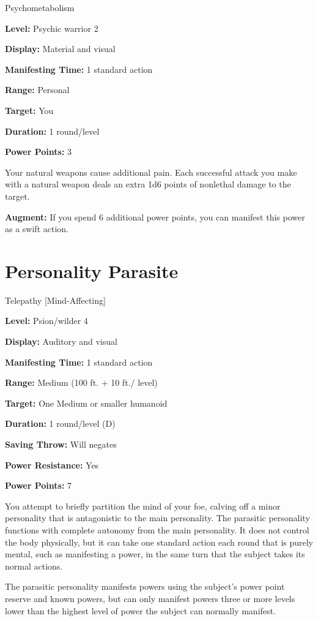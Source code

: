 \documentclass{article}
\begin{document}
Psychometabolism

\textbf{Level:} Psychic warrior 2

\textbf{Display:} Material and visual

\textbf{Manifesting Time:} 1 standard action

\textbf{Range:} Personal

\textbf{Target:} You

\textbf{Duration:} 1 round/level

\textbf{Power Points:} 3

Your natural weapons cause additional pain. Each successful attack you make with 
a natural weapon deals an extra 1d6 points of nonlethal damage to the target.

\textbf{Augment:} If you spend 6 additional power points, you can manifest this 
power as a swift action.

\vspace{12pt}
\section*{Personality Parasite}

Telepathy [Mind-Affecting]

\textbf{Level:} Psion/wilder 4

\textbf{Display:} Auditory and visual

\textbf{Manifesting Time:} 1 standard action

\textbf{Range:} Medium (100 ft. + 10 ft./ level)

\textbf{Target:} One Medium or smaller humanoid

\textbf{Duration:} 1 round/level (D)

\textbf{Saving Throw:} Will negates

\textbf{Power Resistance:} Yes

\textbf{Power Points:} 7

You attempt to briefly partition the mind of your foe, calving off a minor personality 
that is antagonistic to the main personality. The parasitic personality functions 
with complete autonomy from the main personality. It does not control the body 
physically, but it can take one standard action each round that is purely mental, 
such as manifesting a power, in the same turn that the subject takes its normal 
actions.

The parasitic personality manifests powers using the subject's power point reserve 
and known powers, but can only manifest powers three or more levels lower than 
the highest level of power the subject can normally manifest. 
\end{document}
